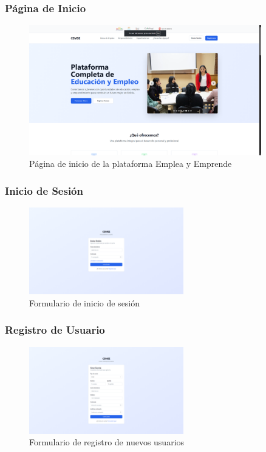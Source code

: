\documentclass[12pt,a4paper]{article}
\begin{document}
\begin{enumerate}
\subsubsection{Página de Inicio}
\begin{figure}[H]
    \centering
    \includegraphics[width=0.9\textwidth]{screenshots/auth/landing-page.png}
    \caption{Página de inicio de la plataforma Emplea y Emprende}
    \label{fig:landing-page}
\end{figure}

\subsubsection{Inicio de Sesión}
\begin{figure}[H]
    \centering
    \includegraphics[width=0.6\textwidth]{screenshots/auth/sign-in.png}
    \caption{Formulario de inicio de sesión}
    \label{fig:sign-in}
\end{figure}

\subsubsection{Registro de Usuario}
\begin{figure}[H]
    \centering
    \includegraphics[width=0.6\textwidth]{screenshots/auth/sign-up.png}
    \caption{Formulario de registro de nuevos usuarios}
    \label{fig:sign-up}
\end{figure}


\end{enumerate}
\end{document}
